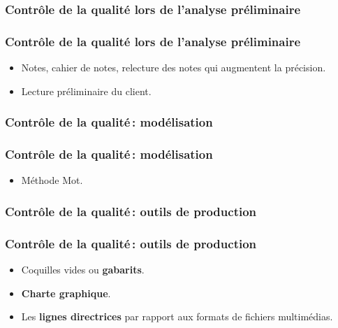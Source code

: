 					\subsubsection{Contrôle de la qualité lors de l'analyse préliminaire} 
							\begin{frame}
							\frametitle{Contrôle de la qualité lors de l'analyse préliminaire}
                        				
							\begin{itemize}
							
							\item Notes, cahier de notes, relecture des notes qui augmentent la précision.
							\item Lecture préliminaire du client. 
												
							\end{itemize}						
					\end{frame}	
					\subsubsection{Contrôle de la qualité\,: modélisation} 
							\begin{frame}[allowframebreaks]
							\frametitle{Contrôle de la qualité\,: modélisation}
                        			
							\begin{itemize}
							\item Méthode Mot.
							\end{itemize}						
					\end{frame}	
					
					\subsubsection{Contrôle de la qualité\,: outils de production} 
							\begin{frame}
							\frametitle{Contrôle de la qualité\,: outils de production}
                        			
							\begin{itemize}
							
							\item Coquilles vides ou \textbf{gabarits}.
							\item \textbf{Charte graphique}.
							\item Les \textbf{lignes directrices} par rapport aux formats de fichiers multimédias.
												
							\end{itemize}						
					\end{frame}	
